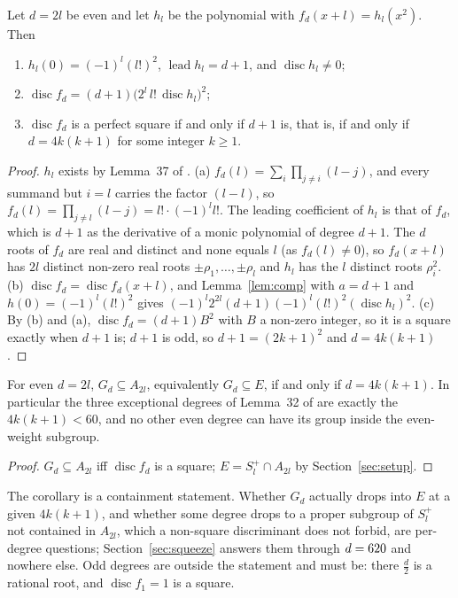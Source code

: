 \documentclass[11pt]{article}
\DeclareMathOperator{\disc}{disc}
\DeclareMathOperator{\lead}{lead}
\newcommand{\Sl}{S_l^{+}}
\begin{document}
\begin{theorem}\label{thm:law}
Let $d=2l$ be even and let $h_l$ be the polynomial with $f_d(x+l)=h_l(x^2)$. Then
\begin{enumerate}
\item[(a)] $h_l(0)=(-1)^l(l!)^2$, $\lead h_l=d+1$, and $\disc h_l\ne0$;
\item[(b)] $\disc f_d=(d+1)\bigl(2^l\,l!\,\disc h_l\bigr)^2$;
\item[(c)] $\disc f_d$ is a perfect square if and only if $d+1$ is, that is, if and only if $d=4k(k+1)$ for some integer $k\ge1$.
\end{enumerate}
\end{theorem}
\begin{proof}
$h_l$ exists by Lemma~37 of \cite{vD24}. (a) $f_d(l)=\sum_i\prod_{j\ne i}(l-j)$, and every summand but $i=l$ carries the factor $(l-l)$, so $f_d(l)=\prod_{j\ne l}(l-j)=l!\cdot(-1)^ll!$. The leading coefficient of $h_l$ is that of $f_d$, which is $d+1$ as the derivative of a monic polynomial of degree $d+1$. The $d$ roots of $f_d$ are real and distinct and none equals $l$ (as $f_d(l)\ne0$), so $f_d(x+l)$ has $2l$ distinct non-zero real roots $\pm\rho_1,\dots,\pm\rho_l$ and $h_l$ has the $l$ distinct roots $\rho_i^2$. (b) $\disc f_d=\disc f_d(x+l)$, and Lemma~\ref{lem:comp} with $a=d+1$ and $h(0)=(-1)^l(l!)^2$ gives $(-1)^l2^{2l}(d+1)(-1)^l(l!)^2(\disc h_l)^2$. (c) By (b) and (a), $\disc f_d=(d+1)B^2$ with $B$ a non-zero integer, so it is a square exactly when $d+1$ is; $d+1$ is odd, so $d+1=(2k+1)^2$ and $d=4k(k+1)$.
\end{proof}

\begin{corollary}\label{cor:law}
For even $d=2l$, $G_d\subseteq A_{2l}$, equivalently $G_d\subseteq E$, if and only if $d=4k(k+1)$. In particular the three exceptional degrees of Lemma~32 of \cite{vD24} are exactly the $4k(k+1)<60$, and no other even degree can have its group inside the even-weight subgroup.
\end{corollary}
\begin{proof}
$G_d\subseteq A_{2l}$ iff $\disc f_d$ is a square; $E=\Sl\cap A_{2l}$ by Section~\ref{sec:setup}.
\end{proof}

\begin{remark}
The corollary is a containment statement. Whether $G_d$ actually drops into $E$ at a given $4k(k+1)$, and whether some degree drops to a proper subgroup of $\Sl$ not contained in $A_{2l}$, which a non-square discriminant does not forbid, are per-degree questions; Section~\ref{sec:squeeze} answers them through $d=620$ and nowhere else. Odd degrees are outside the statement and must be: there $\frac d2$ is a rational root, and $\disc f_1=1$ is a square.
\end{remark}
\end{document}
